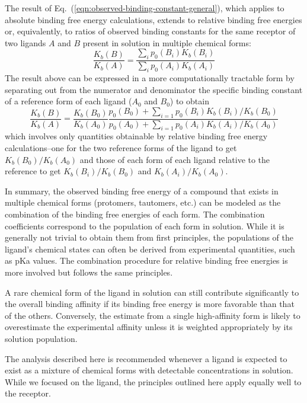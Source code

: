 \documentclass[9pt,bestpractices]{livecoms}
\begin{document}
The result of Eq.~(\ref{eqn:observed-binding-constant-general}), which applies to absolute binding free energy calculations, extends to relative binding free energies or, equivalently, to ratios of observed binding constants for the same receptor of two ligands $A$ and $B$ present in solution in multiple chemical forms:
\begin{equation}
  \frac{K_b(B)}{K_b(A)} = \frac{\sum_i p_0(B_i) K_b(B_i)}{\sum_i p_0(A_i) K_b(A_i)}
  \label{eqn:observed-binding-constant-ratio}
\end{equation}
The result above can be expressed in a more computationally tractable form by separating out from the numerator and denominator the specific binding constant of a reference form of each ligand ($A_0$ and $B_0$) to obtain\cite{de2018rigorous}
\begin{equation}
 \frac{K_b(B)}{K_b(A)} = \frac{K_b(B_0)}{K_b(A_0)} \frac{
 p_0(B_0) + \sum_{i=1} p_0(B_i) K_b(B_i)/K_b(B_0)
 }{
p_0(A_0) + \sum_{i=1} p_0(A_i) K_b(A_i)/K_b(A_0)
 }
\end{equation}
which involves only quantities obtainable by relative binding free energy calculations--one for the two reference forms of the ligand to get  $K_b(B_0)/K_b(A_0)$ and those of each form of each ligand relative to the reference to get $K_b(B_i)/K_b(B_0)$ and $K_b(A_i)/K_b(A_0)$.

In summary, the observed binding free energy of a compound that exists in multiple chemical forms (protomers, tautomers, etc.) can be modeled as the combination of the binding free energies of each form. The combination coefficients correspond to the population of each form in solution. While it is generally not trivial to obtain them from first principles, the populations of the ligand's chemical states can often be derived from experimental quantities, such as pKa values. The combination procedure for relative binding free energies is more involved but follows the same principles. 

A rare chemical form of the ligand in solution can still contribute significantly to the overall binding affinity if its binding free energy is more favorable than that of the others. Conversely, the estimate from a single high-affinity form is likely to overestimate the experimental affinity unless it is weighted appropriately by its solution population. 

The analysis described here is recommended whenever a ligand is expected to exist as a mixture of chemical forms with detectable concentrations in solution. While we focused on the ligand, the principles outlined here apply equally well to the receptor. 
\end{document}
